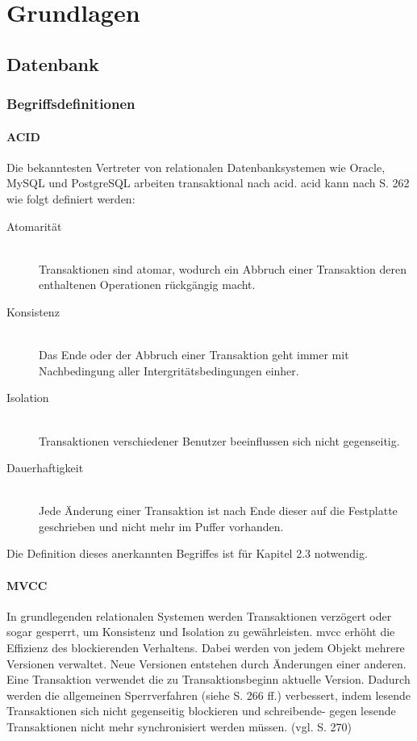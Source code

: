 \chapter{Grundlagen}

\section{Datenbank}

\subsection{Begriffsdefinitionen}

\subsubsection{ACID}
Die bekanntesten Vertreter von relationalen Datenbanksystemen wie Oracle, MySQL und PostgreSQL arbeiten transaktional nach \Gls{acid}.
\Gls{acid} kann nach \cite{book:kudrass} S. 262 wie folgt definiert werden:
\begin{description}
\item[Atomarität] \hfill \\
Transaktionen sind atomar, wodurch ein Abbruch einer Transaktion deren enthaltenen Operationen rückgängig macht.
\item[Konsistenz] \hfill \\
Das Ende oder der Abbruch einer Transaktion geht immer mit Nachbedingung aller Intergritätsbedingungen einher.
\item[Isolation] \hfill \\
Transaktionen verschiedener Benutzer beeinflussen sich nicht gegenseitig.
\item[Dauerhaftigkeit] \hfill \\
Jede Änderung einer Transaktion ist nach Ende dieser auf die Festplatte geschrieben und nicht mehr im Puffer vorhanden.
\end{description}
Die Definition dieses anerkannten Begriffes ist für Kapitel 2.3 notwendig.

\subsubsection{MVCC}
In grundlegenden relationalen Systemen werden Transaktionen verzögert oder sogar gesperrt, um Konsistenz und Isolation zu gewährleisten.
\Gls{mvcc} erhöht die Effizienz des  blockierenden Verhaltens.
Dabei werden von jedem Objekt mehrere Versionen verwaltet.
Neue Versionen entstehen durch Änderungen einer anderen.
Eine Transaktion verwendet die zu Transaktionsbeginn aktuelle Version.
Dadurch werden die allgemeinen Sperrverfahren (siehe \cite{book:kudrass} S. 266 ff.) verbessert, indem lesende Transaktionen sich nicht gegenseitig blockieren und schreibende- gegen lesende Transaktionen nicht mehr synchronisiert werden müssen. (vgl. \cite{book:kudrass} S. 270)

